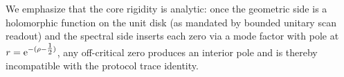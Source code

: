 We emphasize that the core rigidity is analytic: once the geometric side is a holomorphic function on the unit disk (as mandated by bounded unitary scan readout) and the spectral side inserts each zero via a mode factor with pole at $r=\mathrm{e}^{-(\rho-\tfrac{1}{2})}$, any off-critical zero produces an interior pole and is thereby incompatible with the protocol trace identity.


